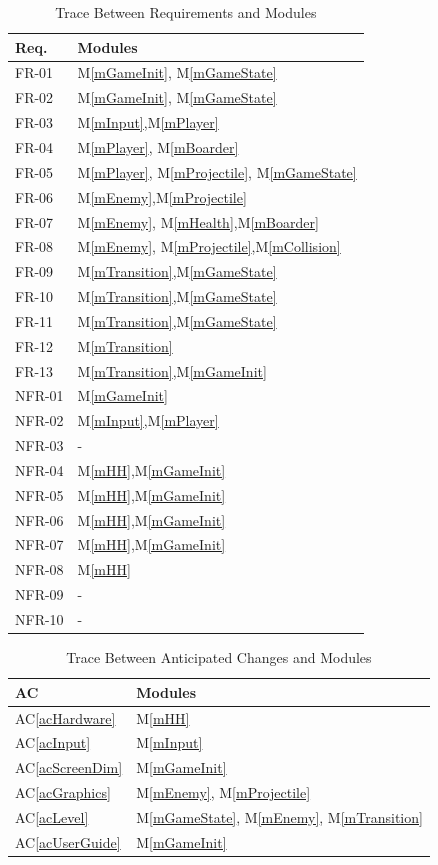 \documentclass[12pt, titlepage]{article}
\newcommand{\acref}[1]{AC\ref{#1}}
\newcommand{\mref}[1]{M\ref{#1}}
\begin{document}
\begin{table}[H]
\centering
\begin{tabular}{p{} p{}}
\toprule
\textbf{Req.} & \textbf{Modules}\\
\midrule
FR-01 & \mref{mGameInit}, \mref{mGameState}\\
FR-02 & \mref{mGameInit}, \mref{mGameState}\\
FR-03 & \mref{mInput},\mref{mPlayer}\\
FR-04 & \mref{mPlayer}, \mref{mBoarder}\\
FR-05 & \mref{mPlayer}, \mref{mProjectile}, \mref{mGameState}\\
FR-06 & \mref{mEnemy},\mref{mProjectile}\\
FR-07 & \mref{mEnemy}, \mref{mHealth},\mref{mBoarder}\\
FR-08 & \mref{mEnemy}, \mref{mProjectile},\mref{mCollision}\\
FR-09 & \mref{mTransition},\mref{mGameState}\\
FR-10 & \mref{mTransition},\mref{mGameState}\\
FR-11 & \mref{mTransition},\mref{mGameState}\\
FR-12 & \mref{mTransition}\\
FR-13 & \mref{mTransition},\mref{mGameInit}\\
NFR-01 & \mref{mGameInit}\\
NFR-02 & \mref{mInput},\mref{mPlayer}\\
NFR-03 & -\\
NFR-04 & \mref{mHH},\mref{mGameInit}\\
NFR-05 & \mref{mHH},\mref{mGameInit}\\
NFR-06 & \mref{mHH},\mref{mGameInit}\\
NFR-07 & \mref{mHH},\mref{mGameInit}\\
NFR-08 & \mref{mHH}\\
NFR-09 & -\\
NFR-10 & -\\
\bottomrule
\end{tabular}
\caption{Trace Between Requirements and Modules}
\label{TblRT}
\end{table}

\begin{table}[H]
\centering
\begin{tabular}{p{} p{}}
\toprule
\textbf{AC} & \textbf{Modules}\\
\midrule
\acref{acHardware} & \mref{mHH}\\
\acref{acInput} & \mref{mInput}\\
\acref{acScreenDim} & \mref{mGameInit}\\
\acref{acGraphics} & \mref{mEnemy}, \mref{mProjectile}\\
\acref{acLevel} & \mref{mGameState}, \mref{mEnemy}, \mref{mTransition}\\
\acref{acUserGuide} & \mref{mGameInit}\\
\bottomrule
\end{tabular}
\caption{Trace Between Anticipated Changes and Modules}
\label{TblACT}
\end{table}
\end{document}
